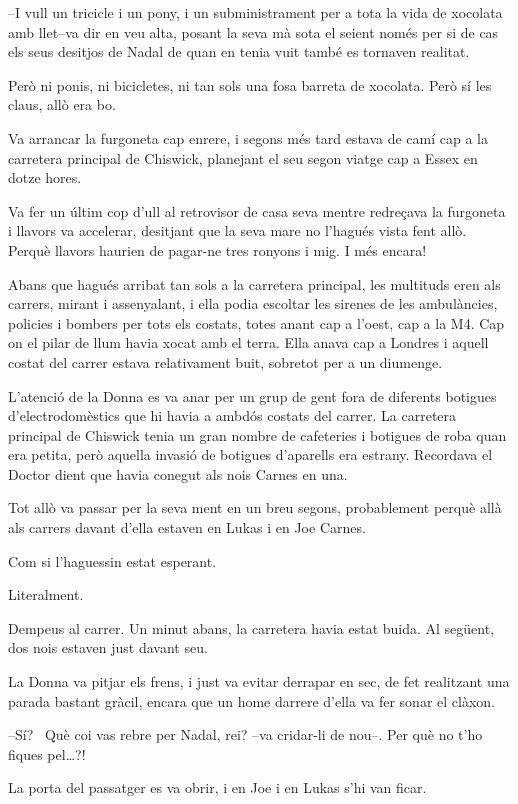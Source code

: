 --I vull un tricicle i un pony, i un subministrament per a tota la vida
de xocolata amb llet--va dir en veu alta, posant la seva mà sota el
seient només per si de cas els seus desitjos de Nadal de quan en tenia
vuit també es tornaven realitat.

Però ni ponis, ni bicicletes, ni tan sols una fosa barreta de xocolata.
Però sí les claus, allò era bo.

Va arrancar la furgoneta cap enrere, i segons més tard estava de camí
cap a la carretera principal de Chiswick, planejant el seu segon viatge
cap a Essex en dotze hores.

Va fer un últim cop d'ull al retrovisor de casa seva mentre redreçava la
furgoneta i llavors va accelerar, desitjant que la seva mare no l'hagués
vista fent allò. Perquè llavors haurien de pagar-ne tres ronyons i mig.
I més encara!

Abans que hagués arribat tan sols a la carretera principal, les
multituds eren als carrers, mirant i assenyalant, i ella podia escoltar
les sirenes de les ambulàncies, policies i bombers per tots els costats,
totes anant cap a l'oest, cap a la M4. Cap on el pilar de llum havia
xocat amb el terra. Ella anava cap a Londres i aquell costat del carrer
estava relativament buit, sobretot per a un diumenge.

L'atenció de la Donna es va anar per un grup de gent fora de diferents
botigues d'electrodomèstics que hi havia a ambdós costats del carrer. La
carretera principal de Chiswick tenia un gran nombre de cafeteries i
botigues de roba quan era petita, però aquella invasió de botigues
d'aparells era estrany. Recordava el Doctor dient que havia conegut als
nois Carnes en una.

Tot allò va passar per la seva ment en un breu segons, probablement
perquè allà als carrers davant d'ella estaven en Lukas i en Joe Carnes.

Com si l'haguessin estat esperant.

Literalment.

Dempeus al carrer. Un minut abans, la carretera havia estat buida. Al
següent, dos nois estaven just davant seu.

La Donna va pitjar els frens, i just va evitar derrapar en sec, de fet
realitzant una parada bastant gràcil, encara que un home darrere d'ella
va fer sonar el clàxon.

--Sí? ~Què coi vas rebre per Nadal, rei? --va cridar-li de nou--. Per
què no t'ho fiques pel\ldots{}?!

La porta del passatger es va obrir, i en Joe i en Lukas s'hi van ficar.

